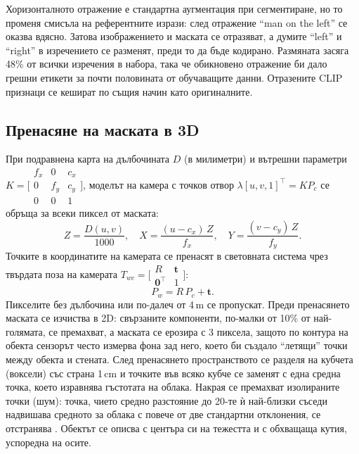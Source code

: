 \documentclass[conference,a4paper]{IEEEtran}
\newcommand{\en}[1]{\enquote{#1}}
\begin{document}
Хоризонталното отражение е стандартна аугментация при сегментиране, но то променя смисъла на
референтните изрази: след отражение \en{man on the left} се оказва вдясно. Затова изображението и
маската се отразяват, а думите \en{left} и \en{right} в изречението се разменят, преди то да бъде
кодирано. Размяната засяга 48\% от всички изречения в набора, така че обикновено отражение би дало
грешни етикети за почти половината от обучаващите данни. Отразените CLIP признаци се кешират по същия
начин като оригиналните.

\subsection{Пренасяне на маската в 3D}
\label{sec:method-3d}

При подравнена карта на дълбочината $D$ (в милиметри) и вътрешни параметри
$K = \bigl[\begin{smallmatrix} f_x & 0 & c_x\\ 0 & f_y & c_y \\ 0 & 0 & 1\end{smallmatrix}\bigr]$, моделът на камера с точков отвор $\lambda[u,v,1]^\top = K P_c$ се обръща за всеки пиксел от
маската:
\begin{equation}
Z = \frac{D(u,v)}{1000},\quad X = \frac{(u - c_x)\,Z}{f_x},\quad Y = \frac{(v - c_y)\,Z}{f_y}.
\label{eq:backproject}
\end{equation}
Точките в координатите на камерата се пренасят в световната система чрез твърдата поза на камерата
$T_{wc} = \bigl[\begin{smallmatrix} R & \mathbf{t} \\ \mathbf{0}^\top & 1\end{smallmatrix}\bigr]$:
\begin{equation}
P_w = R\,P_c + \mathbf{t}.
\label{eq:world}
\end{equation}
Пикселите без дълбочина или по-далеч от 4\,m се пропускат. Преди пренасянето маската се изчиства в
2D: свързаните компоненти, по-малки от 10\% от най-голямата, се премахват, а маската се ерозира с 3
пиксела, защото по контура на обекта сензорът често измерва фона зад него, което би създало
\enquote{летящи} точки между обекта и стената. След пренасянето пространството се разделя на
кубчета (воксели) със страна 1\,cm и точките във всяко кубче се заменят с една средна точка, което
изравнява гъстотата на облака. Накрая се премахват изолираните точки (шум): точка, чието средно
разстояние до 20-те ѝ най-близки съседи надвишава средното за облака с повече от две стандартни
отклонения, се отстранява \cite{rusu2008objectmaps}. Обектът се описва с
центъра си на тежестта и с обхващаща кутия, успоредна на осите.
\end{document}
